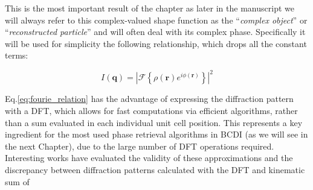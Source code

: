  



This is the most important result of the chapter as later in the manuscript we will always refer to this complex-valued 
shape function as the ``\textit{complex object}'' or ``\textit{reconstructed particle}'' and will often deal with its 
complex phase. Specifically it will be used for simplicity the following relationship, which drops all the constant terms: 

\begin{equation}
    I(\mathbf q) =  \left| \mathcal{F}\!\left\{ \rho(\mathbf{r}) e^{i \phi(\mathbf{r})} \right\} \right |^2
    \label{eq:fourie_relation}
\end{equation}

Eq.\ref{eq:fourie_relation} has the advantage of expressing the diffraction pattern with a DFT, which allows for 
fast computations via efficient algorithms, rather than a sum evaluated in each individual unit cell position. This 
represents a key ingredient for the most used phase retrieval algorithms in BCDI (as we will see in the next Chapter), 
due to the large number of DFT operations required. Interesting works have evaluated the validity of these approximations
\cite{Godard2021} and the discrepancy between diffraction patterns calculated with the DFT and kinematic sum \cite{Haag2013, Madsen2021}
of 

